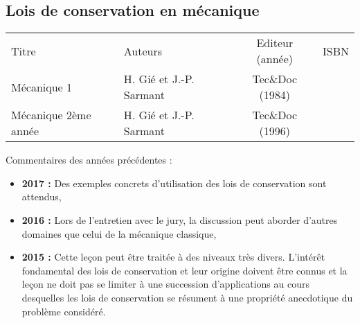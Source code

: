 \begin{headerBlock}
  \chapter{Lois de conservation en mécanique}
    \label{LP_LoisConservation}
\end{headerBlock}

\begin{center}
\begin{tabularx}{\textwidth}{| X | X | c | c |}
  \hline
  \rowcolor{gray!20}\multicolumn{4}{c}{Bibliographie de la leçon : } \\
  \hline 
  Titre & Auteurs & Editeur (année) & ISBN \\
  \hline
  Mécanique 1 & H. Gié et J.-P. Sarmant & Tec\&Doc (1984) & \\
  \hline
  Mécanique 2ème année & H. Gié et J.-P. Sarmant & Tec\&Doc (1996) & \\
  \hline
\end{tabularx}
\end{center}

\begin{reportBlock}{Commentaires des années précédentes :}
    \begin{itemize}
        \item \textbf{2017 :} Des exemples concrets d’utilisation des lois de conservation sont attendus,
        \item \textbf{2016 :} Lors de l’entretien avec le jury, la discussion peut aborder d’autres domaines que celui de la mécanique classique,
        \item \textbf{2015 :} Cette leçon peut être traitée à des niveaux très divers. L’intérêt fondamental des lois de conservation et leur origine doivent être connus et la leçon ne doit pas se limiter à une succession d’applications au cours desquelles les lois de conservation se résument à une propriété anecdotique du problème considéré.
    \end{itemize}
\end{reportBlock}


